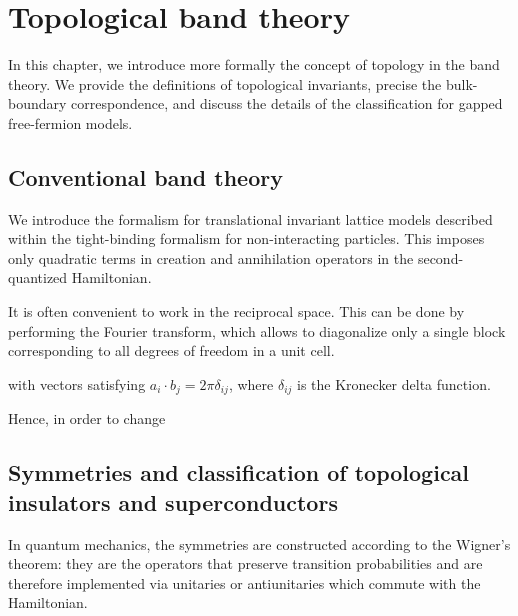 \chapter{Topological band theory}
\label{ch:topo-intro}
In this chapter, we introduce more formally the concept of topology in the band theory. We provide the definitions of topological invariants, precise the bulk-boundary correspondence, and discuss the details of the classification for gapped free-fermion models.

\section{Conventional band theory}
We introduce the formalism for translational invariant lattice models described within the tight-binding formalism for non-interacting particles. This imposes only quadratic terms in creation and annihilation operators in the second-quantized Hamiltonian.

It is often convenient to work in the reciprocal space. This can be done by performing the Fourier transform, which allows to diagonalize only a single block corresponding to all degrees of freedom in a unit cell.


with vectors satisfying $a_i \cdot b_j = 2 \pi \delta_{ij}$, where $\delta_{ij}$ is the Kronecker delta function.


Hence, in order to change

%
%
%
%
%


\section{Symmetries and classification of topological insulators and superconductors}
In quantum mechanics, the symmetries are constructed according to the Wigner's theorem: they are the operators that preserve transition probabilities and are therefore implemented via unitaries or antiunitaries which commute with the Hamiltonian. 

